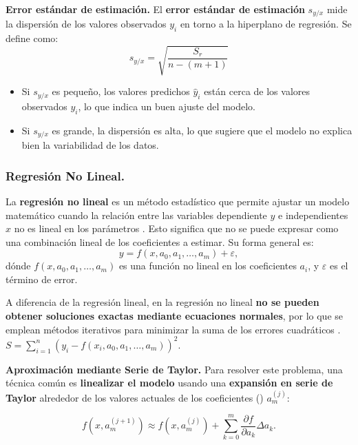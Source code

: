 \documentclass{article}
\begin{document}
\noindent \textbf{Error estándar de estimación.} El \textbf{error estándar de estimación} $s_{y/x}$ mide la dispersión de los valores observados $y_i$ en torno a la hiperplano de regresión. Se define como:
\begin{equation}
    s_{y/x} = \sqrt{\frac{S_r}{n - (m+1)}}
\end{equation}

\begin{itemize}
    \item Si $s_{y/x}$ es pequeño, los valores predichos $\hat{y}_i$ están cerca de los valores observados $y_i$, lo que indica un buen ajuste del modelo.
    \item Si $s_{y/x}$ es grande, la dispersión es alta, lo que sugiere que el modelo no explica bien la variabilidad de los datos.
\end{itemize}

\newpage
\subsubsection{Regresión No Lineal.}
\label{subsec:rnolineal}
La \textbf{regresión no lineal} es un método estadístico que permite ajustar un modelo matemático cuando la relación entre las variables dependiente $y$ e independientes $x$ no es lineal en los parámetros \cite{nolineal1, nolineal2}. Esto significa que no se puede expresar como una combinación lineal de los coeficientes a estimar. Su forma general es:
\begin{equation}
    y = f(x, a_0, a_1, \dots, a_m) + \varepsilon,
\end{equation}
dónde $f(x, a_0, a_1, \dots, a_m)$ es una función no lineal en los coeficientes $a_i$, y $\varepsilon$ es el término de error.

A diferencia de la regresión lineal, en la regresión no lineal \textbf{no se pueden obtener soluciones exactas mediante ecuaciones normales}, por lo que se emplean métodos iterativos para minimizar la suma de los errores cuadráticos \cite{nolineal1}.
$S = \sum_{i=1}^{n} (y_i - f(x_i, a_0, a_1, \dots, a_m))^2.$
\vspace{3mm}

\noindent \textbf{Aproximación mediante Serie de Taylor.} Para resolver este problema, una técnica común es \textbf{linealizar el modelo} usando una \textbf{expansión en serie de Taylor} alrededor de los valores actuales de los coeficientes (\cite{nolineal2}) $a_m^{(j)}$:

\begin{equation}
    f(x, a_m^{(j+1)}) \approx f(x, a_m^{(j)}) + \sum_{k=0}^{m} \frac{\partial f}{\partial a_k} \Delta a_k.
\end{equation}
\end{document}
